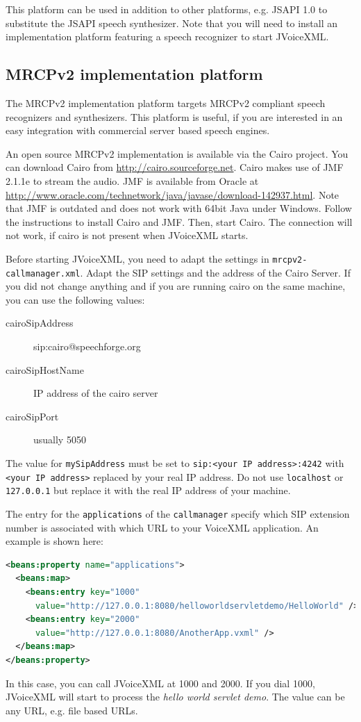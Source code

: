 \documentclass[11pt,a4paper]{article}
\begin{document}
This platform can be used in addition to other platforms, e.g. JSAPI 1.0 to
substitute the JSAPI speech synthesizer. Note that you will need to install an
implementation platform featuring a speech recognizer to start JVoiceXML.


\subsection{MRCPv2 implementation platform}

The MRCPv2 implementation platform targets MRCPv2 compliant speech recognizers
and synthesizers. This platform is useful, if you are interested in an easy
integration with commercial server based speech engines.

An open source MRCPv2 implementation is available via the Cairo project. You can
download Cairo from \url{http://cairo.sourceforge.net}. Cairo makes use of JMF
2.1.1e to stream the audio. JMF is available from Oracle at
\url{http://www.oracle.com/technetwork/java/javase/download-142937.html}. Note
that JMF is outdated and does not work with 64bit Java under Windows.
Follow the instructions to install Cairo and JMF. Then, start Cairo. The
connection will not work, if cairo is not present when JVoiceXML starts. 

Before starting JVoiceXML, you need to adapt the settings in
\lstinline{mrcpv2-callmanager.xml}. Adapt the SIP settings and the address of
the Cairo Server. If you did not change anything and if you are running cairo
on the same machine, you can use the following values:
\begin{description}
\item[cairoSipAddress] sip:cairo@speechforge.org
\item[cairoSipHostName] IP address of the cairo server
\item[cairoSipPort] usually 5050
\end{description}

The value for \texttt{mySipAddress} must be set to \texttt{sip:<your IP
address>:4242} with \texttt{<your IP address>} replaced by your real IP address. 
Do not use \texttt{localhost} or 
\texttt{127.0.0.1} but replace it with the real IP address of your machine.

The entry for the \lstinline{applications} of the \lstinline{callmanager}
specify which SIP extension number is associated with which URL to your
VoiceXML application.
An example is shown here:
\begin{lstlisting}[language=XML]
<beans:property name="applications">
  <beans:map>
    <beans:entry key="1000"
      value="http://127.0.0.1:8080/helloworldservletdemo/HelloWorld" />
    <beans:entry key="2000"
      value="http://127.0.0.1:8080/AnotherApp.vxml" />
  </beans:map>
</beans:property>
\end{lstlisting}
In this case, you can call JVoiceXML at 1000 and 2000. If you dial 1000,
JVoiceXML will start to process the \emph{hello world servlet demo}. 
The value can be any URL, e.g. file based URLs.
\end{document}
